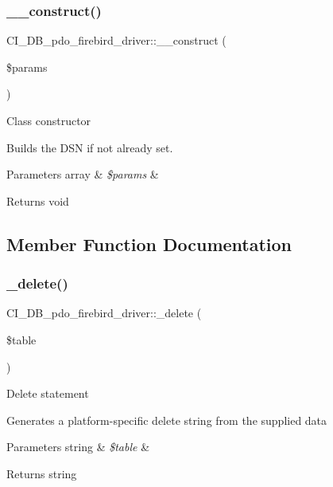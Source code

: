 \subsubsection{\texorpdfstring{\+\_\+\+\_\+construct()}{\_\_construct()}}
{\footnotesize\ttfamily C\+I\+\_\+\+D\+B\+\_\+pdo\+\_\+firebird\+\_\+driver\+::\+\_\+\+\_\+construct (\begin{DoxyParamCaption}\item[{}]{\$params }\end{DoxyParamCaption})}

Class constructor

Builds the D\+SN if not already set.


\begin{DoxyParams}[1]{Parameters}
array & {\em \$params} & \\
\hline
\end{DoxyParams}
\begin{DoxyReturn}{Returns}
void 
\end{DoxyReturn}


\subsection{Member Function Documentation}
\mbox{\label{class_c_i___d_b__pdo__firebird__driver_a097073e5bc3b0196d156cb9139682db9}} 
\subsubsection{\texorpdfstring{\+\_\+delete()}{\_delete()}}
{\footnotesize\ttfamily C\+I\+\_\+\+D\+B\+\_\+pdo\+\_\+firebird\+\_\+driver\+::\+\_\+delete (\begin{DoxyParamCaption}\item[{}]{\$table }\end{DoxyParamCaption})\hspace{0.3cm}{\ttfamily [protected]}}

Delete statement

Generates a platform-\/specific delete string from the supplied data


\begin{DoxyParams}[1]{Parameters}
string & {\em \$table} & \\
\hline
\end{DoxyParams}
\begin{DoxyReturn}{Returns}
string 
\end{DoxyReturn}
\mbox{\label{class_c_i___d_b__pdo__firebird__driver_add25bc0120e2e3d3a4516906f045898b}} 
